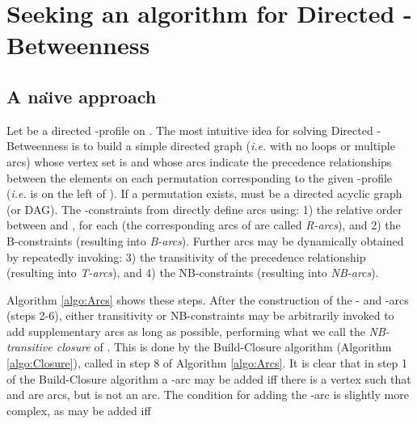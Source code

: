 \documentclass{article}
\begin{document}
\section{Seeking an algorithm for {\sc Directed -Betweenness}}\label{sect:GeneralD}

\subsection{A na\"{\i}ve approach}

Let  be a directed -profile on . The most intuitive idea for solving 
Directed -{\sc Betweenness} is  to build a simple
directed graph  ({\em i.e.} with no loops or multiple arcs)
whose vertex set  is  and whose arcs  indicate the precedence relationships
between the elements on each permutation corresponding to the given -profile ({\em i.e.}  is on the
left of ). If a permutation exists,  must be a directed acyclic graph (or DAG). 
The -constraints from  directly define arcs using: 1) the relative order between  and ,  
for each  (the corresponding arcs of  are called {\em R-arcs}), 
and 2) the B-constraints (resulting into  {\em B-arcs}). Further arcs may be dynamically obtained by repeatedly invoking:  
3) the transitivity of the precedence relationship 
(resulting into {\em T-arcs}), and 4) the NB-constraints  (resulting into {\em NB-arcs}).  

Algorithm \ref{algo:Arcs} shows these steps. After the construction of the - and -arcs (steps
2-6), either transitivity or NB-constraints may be arbitrarily invoked to add supplementary
arcs as long as possible, performing what we call the {\em NB-transitive closure}
of . This is done by the Build-Closure algorithm (Algorithm \ref{algo:Closure}), called in
step 8 of Algorithm \ref{algo:Arcs}. It is clear that in step 1 of the Build-Closure algorithm
a -arc  may be added iff there is a vertex
  such that  and  are arcs, but  is not an arc. The condition for
adding the -arc  is slightly more complex, as  may be added iff
\end{document}
